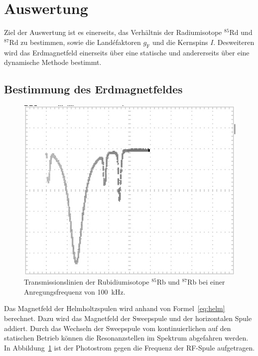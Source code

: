 \section{Auswertung}%
\label{sec:auswertung}

Ziel der Auswertung ist es einerseits, das Verhältnis der Radiumisotope
$^{85}$Rd und $^{87}$Rd zu bestimmen, sowie die Land\'efaktoren $g_\text{F}$ und
die Kernspins $I$.
Desweiteren wird das Erdmagnetfeld einerseits über eine statische
und andererseits über eine dynamische Methode bestimmt.
\subsection{Bestimmung des Erdmagnetfeldes}%
\label{sub:statische_bestimmung_des_erdmagnetfeldes}
\begin{figure}
	\centering
	\includegraphics[width=\linewidth]{picture/Transmission_Spek_cut.JPG}
	\caption{Transmissionslinien der Rubidiumisotope $^{85}$Rb und $^{87}$Rb bei
	einer Anregungsfrequenz von \SI{100}{\kilo\hertz}.}%
	\label{fig:transmission}
\end{figure}
Das Magnetfeld der Helmholtzspulen wird anhand von Formel~\ref{eq:helm}
berechnet.
Dazu wird das Magnetfeld der Sweepspule und der horizontalen Spule addiert.
Durch das Wechseln der Sweepspule vom kontinuierlichen auf den statischen Betrieb
können die Resonanzstellen im Spektrum abgefahren werden.
In Abbildung~\ref{fig:transmission} ist der Photostrom gegen die Frequenz der
RF-Spule aufgetragen.

